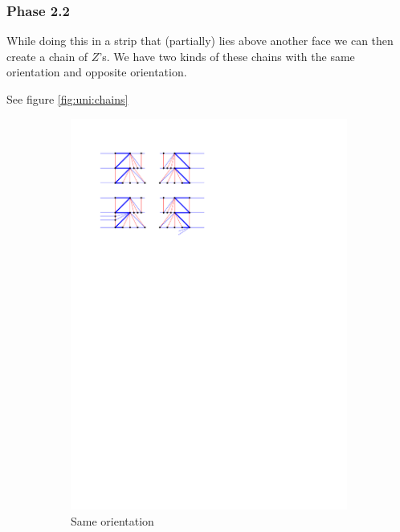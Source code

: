   \subsubsection{Phase 2.2}
    While doing this in a strip that (partially) lies above another face we can then create a chain of $Z$'s. We have two kinds of these chains with the same orientation and opposite orientation.

    See figure \ref{fig:uni:chains}

    \begin{figure}
      \centering
      \begin{subfigure}[b]{0.45 \textwidth}
          \includegraphics[width = \textwidth]{unifiedAlgo/img/post/sameChain}
          \caption{Same orientation}
      \end{subfigure}
      ~
      \begin{subfigure}[b]{0.45 \textwidth}

\end{subfigure}
\end{figure}
